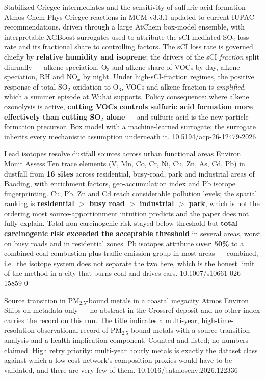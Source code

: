\documentclass[10pt]{article}
\begin{document}
{Stabilized Criegee intermediates and the sensitivity of sulfuric acid formation}
{Atmos Chem Phys}
{Criegee reactions in MCM v3.3.1 updated to current IUPAC recommendations, driven through
a large AtChem box-model ensemble, with interpretable XGBoost surrogates used to attribute
the sCI-mediated SO$_2$ loss rate and its fractional share to controlling factors. The
sCI loss rate is governed chiefly by \textbf{relative humidity and isoprene}; the drivers
of the sCI \emph{fraction} split diurnally --- alkene speciation, O$_3$ and alkene share of
VOCs by day, alkene speciation, RH and NO$_x$ by night. Under high-sCI-fraction regimes,
the positive response of total SO$_2$ oxidation to O$_3$, VOCs and alkene fraction is
\emph{amplified}, which a summer episode at Wuhai supports. Policy consequence: where
alkene ozonolysis is active, \textbf{cutting VOCs controls sulfuric acid formation more
effectively than cutting SO$_2$ alone} --- and sulfuric acid is the new-particle-formation
precursor. Box model with a machine-learned surrogate; the surrogate inherits every
mechanistic assumption underneath it.}
{10.5194/acp-26-12479-2026}

{Lead isotopes resolve dustfall sources across urban functional areas}
{Environ Monit Assess}
{Ten trace elements (V, Mn, Co, Cr, Ni, Cu, Zn, As, Cd, Pb) in dustfall from
\textbf{16 sites} across residential, busy-road, park and industrial areas of Baoding,
with enrichment factors, geo-accumulation index and Pb isotope fingerprinting. Cu, Pb, Zn
and Cd reach considerable pollution levels; the spatial ranking is
\textbf{residential $>$ busy road $>$ industrial $>$ park}, which is not the ordering most
source-apportionment intuition predicts and the paper does not fully explain. Total
non-carcinogenic risk stayed below threshold but \textbf{total carcinogenic risk exceeded
the acceptable threshold} in several areas, worst on busy roads and in residential zones.
Pb isotopes attribute \textbf{over 50\%} to a combined coal-combustion plus
traffic-emission group in most areas --- combined, i.e.\ the isotope system does not
separate the two here, which is the honest limit of the method in a city that burns coal
and drives cars.}
{10.1007/s10661-026-15859-0}

{Source transition in PM$_{2.5}$-bound metals in a coastal megacity}
{Atmos Environ}
{Ships on metadata only --- no abstract in the Crossref deposit and no other index carries
the record on this run. The title indicates a multi-year, high-time-resolution
observational record of PM$_{2.5}$-bound metals with a source-transition analysis and a
health-implication component. Counted and listed; no numbers claimed. High retry priority:
multi-year hourly metals is exactly the dataset class against which a low-cost network's
composition proxies would have to be validated, and there are very few of them.}
{10.1016/j.atmosenv.2026.122336}
\end{document}
